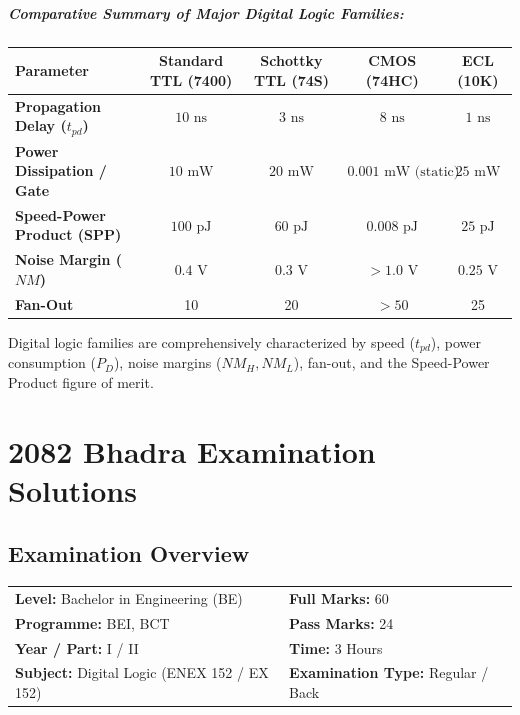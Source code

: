 \documentclass[11pt,a4paper,oneside]{book}
\begin{document}
\paragraph{Comparative Summary of Major Digital Logic Families:}
\begin{center}
\small
\begin{tabular}{@{}lcccc@{}}
\toprule
\textbf{Parameter} & \textbf{Standard TTL (7400)} & \textbf{Schottky TTL (74S)} & \textbf{CMOS (74HC)} & \textbf{ECL (10K)} \\
\midrule
\textbf{Propagation Delay ($t_{pd}$)} & $10\text{ ns}$ & $3\text{ ns}$ & $8\text{ ns}$ & $1\text{ ns}$ \\
\textbf{Power Dissipation / Gate} & $10\text{ mW}$ & $20\text{ mW}$ & $0.001\text{ mW (static)}$ & $25\text{ mW}$ \\
\textbf{Speed-Power Product (SPP)} & $100\text{ pJ}$ & $60\text{ pJ}$ & $0.008\text{ pJ}$ & $25\text{ pJ}$ \\
\textbf{Noise Margin ($NM$)} & $0.4\text{ V}$ & $0.3\text{ V}$ & $> 1.0\text{ V}$ & $0.25\text{ V}$ \\
\textbf{Fan-Out} & 10 & 20 & $> 50$ & 25 \\
\bottomrule
\end{tabular}
\end{center}

\begin{answerbox}
Digital logic families are comprehensively characterized by speed ($t_{pd}$), power consumption ($P_D$), noise margins ($NM_H, NM_L$), fan-out, and the Speed-Power Product figure of merit.
\end{answerbox}

\chapter{2082 Bhadra Examination Solutions}

\section*{Examination Overview}
\begin{tabular}{@{}ll@{}}
\textbf{Level:} Bachelor in Engineering (BE) & \textbf{Full Marks:} 60 \\
\textbf{Programme:} BEI, BCT & \textbf{Pass Marks:} 24 \\
\textbf{Year / Part:} I / II & \textbf{Time:} 3 Hours \\
\textbf{Subject:} Digital Logic (ENEX 152 / EX 152) & \textbf{Examination Type:} Regular / Back \\
\end{tabular}
\end{document}
